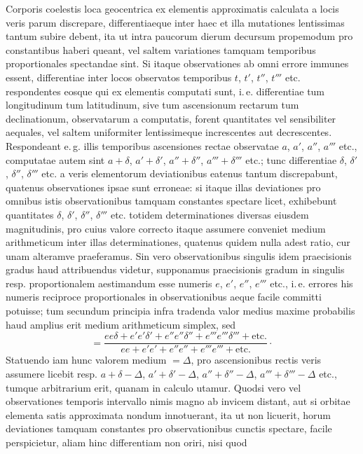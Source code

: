Corporis coelestis loca geocentrica ex elementis approximatis calculata a
locis veris parum discrepare, differentiaeque inter haec et illa mutationes
lentissimas tantum subire debent, ita ut intra paucorum dierum decursum
propemodum pro constantibus haberi queant, vel saltem variationes tamquam
temporibus proportionales spectandae sint. Si itaque observationes ab omni
errore immunes essent, differentiae inter locos observatos temporibus $t$, $t'$, $t''$, $t'''$
etc. respondentes eosque qui ex elementis computati sunt, i.\,e. differentiae
tum longitudinum tum latitudinum, sive tum ascensionum rectarum tum
declinationum, observatarum a computatis, forent quantitates vel sensibiliter
aequales, vel saltem uniformiter lentissimeque increscentes aut decrescentes.
Respondeant e.\,g. illis temporibus ascensiones rectae observatae $a$, $a'$, $a''$, $a'''$
etc., computatae autem sint $a+\delta$, $a'+\delta'$, $a''+\delta''$, $a'''+\delta'''$
etc.; tunc differentiae $\delta$, $\delta'$, $\delta''$, $\delta'''$ etc. a veris
elementorum deviationibus eatenus tantum discrepabunt, quatenus observationes
ipsae sunt erroneae: si itaque illas deviationes pro omnibus istis
observationibus tamquam constantes spectare licet, exhibebunt quantitates
$\delta$, $\delta'$, $\delta''$, $\delta'''$ etc. totidem determinationes diversas
eiusdem magnitudinis, pro cuius valore correcto itaque assumere conveniet
medium arithmeticum inter illas determinationes, quatenus quidem nulla adest
ratio, cur unam alteramve praeferamus. Sin vero observationibus
singulis idem praecisionis gradus haud attribuendus videtur, supponamus
praecisionis gradum in singulis resp. proportionalem aestimandum esse numeris
$e$, $e'$, $e''$, $e'''$ etc., i.\,e. errores his numeris reciproce proportionales
in observationibus aeque facile committi potuisse; tum secundum principia
infra tradenda valor medius maxime probabilis haud amplius erit medium
arithmeticum simplex, sed
\[
=\frac{ee\delta+e'e'\delta'+e''e''\delta''+e'''e'''\delta'''+\text{etc.}}
{ee+e'e'+e''e''+e'''e'''+\text{etc.}}\mathpunct{\cdot}
\]
Statuendo iam hunc valorem medium $=\Delta$, pro ascensionibus rectis veris
assumere licebit resp. $a+\delta-\Delta$, $a'+\delta'-\Delta$, $a''+\delta''-\Delta$,
$a'''+\delta'''-\Delta$ etc., tumque arbitrarium erit, quanam in calculo utamur.
Quodsi vero vel observationes temporis intervallo nimis magno ab invicem
distant, aut si orbitae elementa satis approximata nondum innotuerant, ita ut
non licuerit, horum deviationes tamquam constantes pro observationibus cunctis
spectare, facile perspicietur, aliam hinc differentiam non oriri, nisi quod
